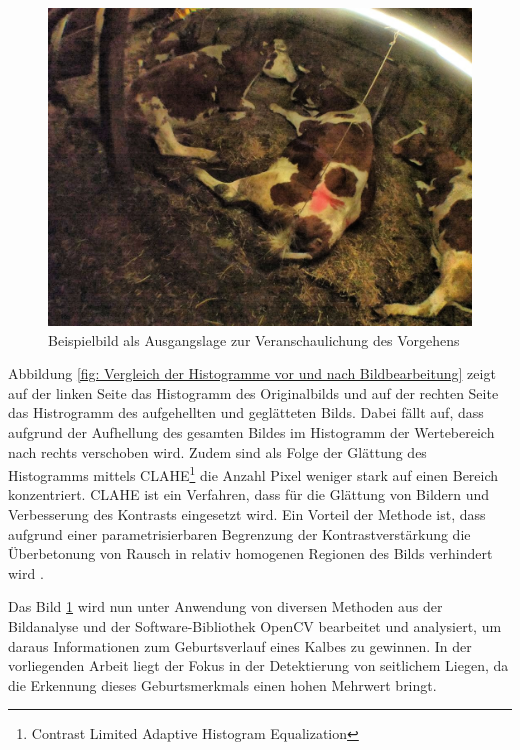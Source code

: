\begin{figure}[H]
	\center
	\includegraphics[scale=0.43]{Grafiken/entwicklung/1ausgangsbildBericht.jpg}
	\caption{Beispielbild als Ausgangslage zur Veranschaulichung des Vorgehens} 
	\label{fig: Ausgangslage für die Bildanalyse}
\end{figure}

Abbildung \ref{fig: Vergleich der Histogramme vor und nach Bildbearbeitung} zeigt auf der linken Seite das Histogramm des Originalbilds und auf der rechten Seite das Histrogramm des aufgehellten und geglätteten Bilds. Dabei fällt auf, dass aufgrund der Aufhellung des gesamten Bildes im Histogramm der Wertebereich nach rechts verschoben wird. Zudem sind als Folge der Glättung des Histogramms mittels CLAHE\footnote{Contrast Limited Adaptive Histogram Equalization} die Anzahl Pixel weniger stark auf einen Bereich konzentriert. CLAHE ist ein Verfahren, dass für die Glättung von Bildern und Verbesserung des Kontrasts eingesetzt wird. Ein Vorteil der Methode ist, dass aufgrund einer parametrisierbaren Begrenzung der Kontrastverstärkung die Überbetonung von Rausch in relativ homogenen Regionen des Bilds verhindert wird \citep[S. 313]{FernandezVillan2019}.

Das Bild \ref{fig: Ausgangslage für die Bildanalyse} wird nun unter Anwendung von diversen Methoden aus der Bildanalyse und der Software-Bibliothek OpenCV bearbeitet und analysiert, um daraus Informationen zum Geburtsverlauf eines Kalbes zu gewinnen. In der vorliegenden Arbeit liegt der Fokus in der Detektierung von seitlichem Liegen, da die Erkennung dieses Geburtsmerkmals einen hohen Mehrwert bringt. 

